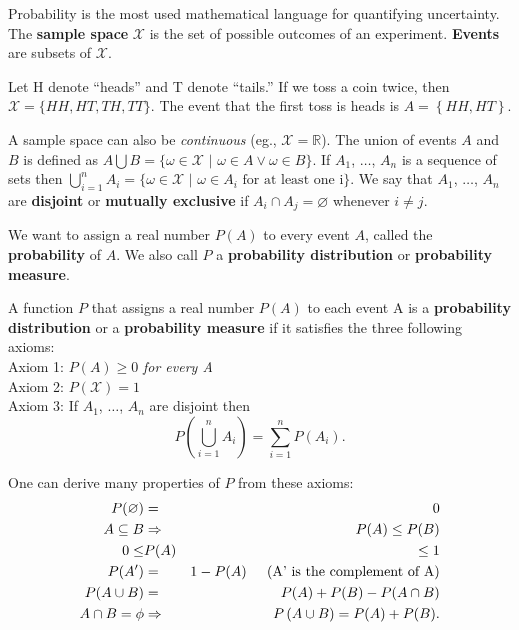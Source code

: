 Probability is the most used mathematical language for quantifying uncertainty. The {\bf sample space} $\mathcal{X}$ is the set of possible outcomes of an experiment. {\bf Events} are subsets of $\mathcal{X}$.

\begin{example}
 Let H denote ``heads'' and T denote ``tails.'' If we toss a coin twice, then $\mathcal{X}=\{ HH, HT, TH, TT\}$. The event that the first toss is heads is $A= \left\{HH, HT \right\}$.
\end{example}

A sample space can also be {\em continuous} (eg., $\mathcal{X}= \mathbb{R}$). The union of events $A$ and $B$ is defined as $A \bigcup B = \{ \omega \in \mathcal{X}\,\,|\,\, \omega \in A \vee \omega \in B\}$. If $A_1$, $\ldots$, $A_n$  is a sequence of sets then $\bigcup\limits_{i=1}^{n}A_{i} = \{ \omega \in \mathcal{X}\,\,|\,\, \omega \in A_{i} \text{ for at least one i}\}$. We say that  $A_1$, $\ldots$, $A_n$ are {\bf disjoint} or {\bf mutually exclusive} if $A_{i} \cap A_{j} = \varnothing$ whenever $i \neq j$.

\vspace{0.1in}
We want to assign a real number $P(A)$  to every event $A$, called the {\bf probability} of $A$. We also call $P$ a {\bf probability distribution} or {\bf probability measure}.

\bigskip

\fbox
{\begin{minipage}[h]{0.9\linewidth} 
\begin{definition}
A function $P$ that assigns a real number $P(A)$ to each event A is a {\bf probability distribution} or a {\bf probability measure} if it satisfies the three following axioms: \\

Axiom 1: $P(A) \geq 0$ {\em for every A} \\
Axiom 2: $P(\mathcal{X}) = 1$ \\
Axiom 3: If  $A_1$, $\ldots$, $A_n$ are disjoint then 
\begin{equation*}
P\left(\bigcup\limits_{i=1}^{n} A_{i}\right) = \sum\limits_{i=1}^{n} P(A_{i}).
\end{equation*}
\end{definition}
\end{minipage}}

\vspace{0.1in}
One can derive many properties of $P$ from these axioms:
\begin{eqnarray*}
P(\varnothing) &= &0 \\
A \subseteq B &\Rightarrow &P(A) \leq P(B) \\
0 \leq &P(A) &\leq 1 \\
P(A') &= &1 - P(A) \hspace{0.2in}(\text{A' is the complement of A}) \\
P(A \cup B) &=& P(A) + P(B) - P(A \cap B) \\
A \cap B = \phi &\Rightarrow &P\left( A \cup B\right) = P(A) + P(B).
\end{eqnarray*}

